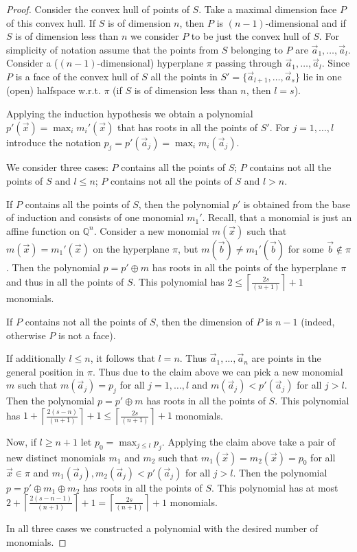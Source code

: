 \documentclass[11pt]{article}
\newcommand{\ta}{\oplus}
\newcommand{\bb}[1]{\mathbb{#1}}
\begin{document}
\begin{proof}
Consider the convex hull of points of $S$. Take a maximal dimension face $P$ of this convex hull. If $S$ is of dimension $n$, then $P$ is $(n-1)$-dimensional and if $S$ is of dimension less than $n$ we consider $P$ to be just the convex hull of $S$. For simplicity of notation assume that the points from $S$ belonging to $P$ are $\vec{a}_1,\ldots,\vec{a}_l$. 
Consider a ($(n-1)$-dimensional) hyperplane $\pi$ passing through $\vec{a}_1,\ldots, \vec{a}_l$. Since $P$ is a face of the convex hull of $S$ all the points  in $S' = \{\vec{a}_{l+1},\ldots,\vec{a}_s\}$ lie in one (open) halfspace w.r.t. $\pi$ (if $S$ is of dimension less than $n$, then $l=s$). 

Applying the induction hypothesis we obtain a polynomial $p'(\vec{x}) = \max_i m_i'(\vec{x})$ that has roots in all the points of $S'$. For $j=1,\ldots, l$ introduce the notation $p_j = p'(\vec{a}_j) = \max_{i} m_{i}(\vec{a}_j)$.

We consider three cases: $P$ contains all the points of $S$; $P$ contains not all the points of $S$ and $l \leq n$; $P$ contains not all the points of $S$ and $l > n$.

If $P$ contains all the points of $S$, then the polynomial $p'$ is obtained from the base of induction and consists of one monomial $m_1'$. Recall, that a monomial is just an affine function on $\bb{Q}^n$. Consider a new monomial $m(\vec{x})$ such that $m(\vec{x})=m_1'(\vec{x})$ on the hyperplane $\pi$, but $m(\vec{b}) \neq m_{1}'(\vec{b})$ for some $\vec{b} \notin \pi$. Then the polynomial $p = p' \ta m$ has roots in all the points of the hyperplane $\pi$ and thus in all the points of $S$. This polynomial has $2 \leq \left\lceil \frac{2s}{(n+1)}\right\rceil + 1$ monomials.


If $P$ contains not all the points of $S$, then the dimension of $P$ is $n-1$ (indeed, otherwise $P$ is not a face).

If additionally $l \leq n$, it follows that $l=n$.
Thus $\vec{a}_1,\ldots, \vec{a}_n$ are points in the general position in $\pi$. Thus due to the claim above we can pick a new monomial $m$ such that $m(\vec{a}_j) = p_j$ for all $j=1,\ldots,l$ and $m(\vec{a}_j) < p'(\vec{a}_j)$ for all $j > l$. Then the polynomial $p = p' \ta m$ has roots in all the points of $S$. This polynomial has 
$
1 + \left\lceil \frac{2(s-n)}{(n+1)}\right\rceil + 1 \leq \left\lceil \frac{2s}{(n+1)}\right\rceil + 1
$
monomials.

Now, if $l\geq n+1$ let $p_0 = \max_{j\leq l} p_j$.
Applying the claim above take a pair of new distinct monomials $m_1$ and $m_2$ such that $m_1(\vec{x})=m_2(\vec{x})=p_0$ for all $\vec{x} \in \pi$ and  $m_1(\vec{a}_j), m_2(\vec{a}_j) < p'(\vec{a}_j)$ for all $j > l$.
Then the polynomial $p = p' \ta m_1 \ta m_2$ has roots in all the points of $S$. This polynomial has at most
$
2 + \left\lceil \frac{2(s-n-1)}{(n+1)}\right\rceil + 1 = \left\lceil \frac{2s}{(n+1)}\right\rceil + 1
$
monomials.

In all three cases we constructed a polynomial with the desired number of monomials.
\end{proof}
\end{document}
